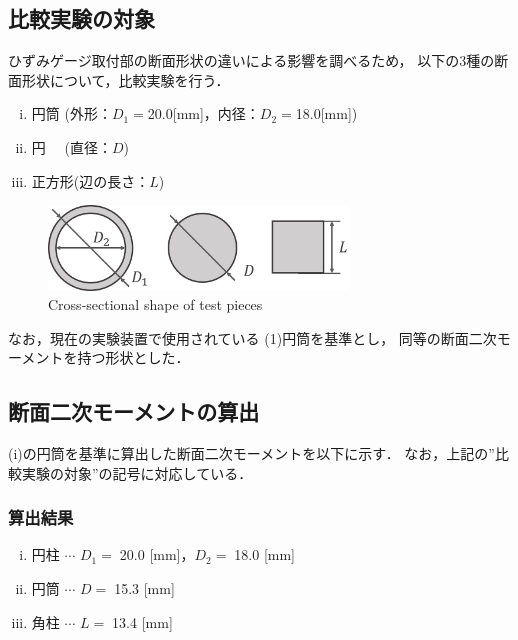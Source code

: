\documentclass[twocolumn,a4j]{jsarticle}
\begin{document}
\newpage
\subsection{比較実験の対象}
ひずみゲージ取付部の断面形状の違いによる影響を調べるため，
以下の3種の断面形状について，比較実験を行う．\par
\begin{enumerate}[(i)]
    \item 円筒  (外形：$D_1=$20.0[mm]，内径：$D_2=$18.0[mm])
    \item 円　  (直径：$D$)
    \item 正方形(辺の長さ：$L$)
\end{enumerate}
\begin{figure}[htbp]
    \footnotesize
    \begin{center}
        \includegraphics[width=80mm]{../images/testpieces_2.png}
        \caption{Cross-sectional shape of test pieces}
    \end{center}
\end{figure}
なお，現在の実験装置で使用されている (1)円筒を基準とし，
同等の断面二次モーメントを持つ形状とした．\\

\subsection{断面二次モーメントの算出}
(i)の円筒を基準に算出した断面二次モーメントを以下に示す．
なお，上記の”比較実験の対象”の記号に対応している．

\subsubsection{算出結果}
\begin{screen}
    \begin{enumerate}[(i)]
        \item 円柱 $\cdots$ $D_1=\;$20.0 [mm]，$D_2=\;$18.0 [mm]
        \item 円筒 $\cdots$ $D=\;$15.3 [mm]
        \item 角柱 $\cdots$ $L=\;$13.4 [mm]
    \end{enumerate}
\end{screen}
\end{document}
